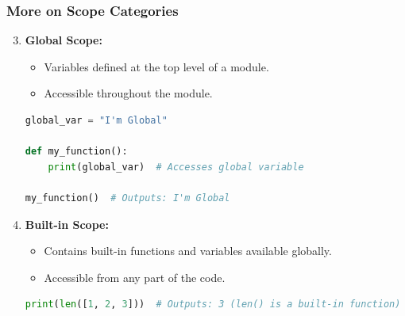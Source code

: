 \documentclass{beamer}
\begin{document}
\begin{frame}[fragile]
    \frametitle{More on Scope Categories}
    \begin{enumerate}
        \setcounter{enumi}{2} %
        \item \textbf{Global Scope:}
        \begin{itemize}
            \item Variables defined at the top level of a module.
            \item Accessible throughout the module.
        \end{itemize}
        
        \begin{lstlisting}[language=Python]
global_var = "I'm Global"

def my_function():
    print(global_var)  # Accesses global variable

my_function()  # Outputs: I'm Global
        \end{lstlisting}

        \item \textbf{Built-in Scope:}
        \begin{itemize}
            \item Contains built-in functions and variables available globally.
            \item Accessible from any part of the code.
        \end{itemize}
        
        \begin{lstlisting}[language=Python]
print(len([1, 2, 3]))  # Outputs: 3 (len() is a built-in function)
        \end{lstlisting}
    \end{enumerate}
\end{frame}
\end{document}
